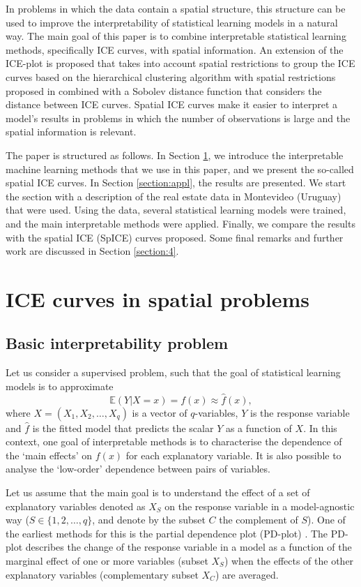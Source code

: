 \documentclass[smallextended,natbib]{svjour3}\usepackage[]{graphicx}\usepackage[]{xcolor}
\newcommand{\1}[1]{\mathbbm{1}_{#1}}
\begin{document}
In problems in which the data contain a spatial structure, this structure can be used to improve the interpretability of statistical learning models in a natural way. The main goal of this paper is to combine interpretable statistical learning methods, specifically ICE curves, with spatial information. An extension of the ICE-plot is proposed that takes into account spatial restrictions to group the ICE curves based on the hierarchical clustering algorithm with spatial restrictions proposed in \cite{chavent2018} combined with a Sobolev distance function that considers the distance between ICE curves. Spatial ICE curves make it easier to interpret a model's results in problems in which the number of observations is large and the spatial information is relevant.

The paper is structured as follows. In  Section \ref{section:2}, we introduce the interpretable machine learning methods that we use in this paper, and we present the so-called spatial ICE curves. In Section \ref{section:appl}, the results are presented. We start the section with a description of the real estate data in Montevideo (Uruguay) that were used. Using the data, several statistical learning models were trained, and the main interpretable methods were applied. Finally, we compare the results with the spatial ICE (SpICE) curves proposed. Some final remarks and further work are discussed in Section \ref{section:4}.

\section{ICE curves in spatial problems} \label{section:2}

\subsection{Basic interpretability problem}
Let us consider a supervised problem, such that the goal of statistical learning models is to approximate 
\[
\mathbb{E}(Y|X=x) = f(x) \approx \hat f(x),
\]
where $X=(X_1,X_2,\dots, X_q)$ is a vector of $q$-variables, $Y$ is the response variable and $\hat f$ is the fitted model that predicts the scalar $Y$ as a function of $X$. In this context, one goal of interpretable methods is to characterise the dependence of the `main effects' on $f(x)$ for each explanatory variable. It is also possible to analyse the `low-order' dependence between pairs of variables. 

Let us assume that the main goal is to understand the effect of a set of explanatory variables denoted as $X_S$ on the response variable in a model-agnostic way ($S \in \{1,2,\dots,q\}$, and denote by the subset $C$ the complement of $S$). One of the earliest methods for this is the partial dependence plot (PD-plot) \citep{friedman2001}. The PD-plot describes the change of the response variable in a model as a function of the marginal effect of one or more variables (subset $X_S$) when the effects of the other explanatory variables (complementary subset $X_C$) are averaged. 
\end{document}
